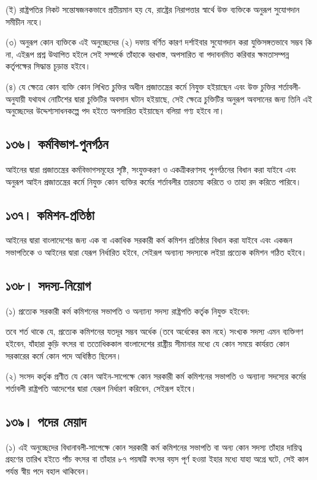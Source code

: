 \documentclass[11pt]{article}
\begin{document}
(ই) রাষ্ট্রপতির নিকট সন্তোষজনকভাবে প্রতীয়মান হয় যে, রাষ্ট্রের নিরাপত্তার
    স্বার্থে উক্ত ব্যক্তিকে অনুরূপ সুযোগদান সমীচীন নহে।

(৩) অনুরূপ কোন ব্যক্তিকে এই অনুচ্ছেদের (২) দফায় বর্ণিত কারণ দর্শাইবার সুযোগদান
    করা যুক্তিসঙ্গতভাবে সম্ভব কি না, এইরূপ প্রশ্ন উত্থাপিত হইলে সেই সম্পর্কে তাঁহাকে
    বরখাস্ত, অপসারিত বা পদাবনমিত করিবার ক্ষমতাসম্পন্ন কর্তৃপক্ষের সিদ্ধান্ত চূড়ান্ত
    হইবে।

(৪) যে ক্ষেত্রে কোন ব্যক্তি কোন লিখিত চুক্তির অধীন প্রজাতন্ত্রের কর্মে নিযুক্ত
    হইয়াছেন এবং উক্ত চুক্তির শর্তাবলী-অনুযায়ী যথাযথ নোটিশের দ্বারা চুক্তিটির অবসান
    ঘটান হইয়াছে, সেই ক্ষেত্রে চুক্তিটির অনুরূপ অবসানের জন্য তিনি এই অনুচ্ছেদের
    উদ্দেশ্যসাধনকল্পে পদ হইতে অপসারিত হইয়াছেন বলিয়া গণ্য হইবে না।

\subsection{১৩৬। কর্মবিভাগ-পুনর্গঠন}
\label{sec:org8ce6071}
আইনের দ্বারা প্রজাতন্ত্রের কর্মবিভাগসমূহের সৃষ্টি, সংযুক্তকরণ ও একত্রীকরণসহ
পুনর্গঠনের বিধান করা যাইবে এবং অনুরূপ আইন প্রজাতন্ত্রের কর্মে নিযুক্ত কোন ব্যক্তির
কর্মের শর্তাবলীর তারতম্য করিতে ও তাহা রদ করিতে পারিবে।

\subsection{১৩৭। কমিশন-প্রতিষ্ঠা}
\label{sec:org63d3256}
আইনের দ্বারা বাংলাদেশের জন্য এক বা একাধিক সরকারী কর্ম কমিশন প্রতিষ্ঠার
বিধান করা যাইবে এবং একজন সভাপতিকে ও আইনের দ্বারা যেরূপ নির্ধারিত হইবে,
সেইরূপ অন্যান্য সদস্যকে লইয়া প্রত্যেক কমিশন গঠিত হইবে।

\subsection{১৩৮। সদস্য-নিয়োগ}
\label{sec:org170a6c6}
(১) প্রত্যেক সরকারী কর্ম কমিশনের সভাপতি ও অন্যান্য সদস্য রাষ্ট্রপতি কর্তৃক নিযুক্ত
    হইবেন:

তবে শর্ত থাকে যে, প্রত্যেক কমিশনের যতদূর সম্ভব অর্ধেক (তবে অর্ধেকের কম নহে)
সংখ্যক সদস্য এমন ব্যক্তিগণ হইবেন, যাঁহারা কুড়ি বৎসর বা ততোধিককাল বাংলাদেশের
রাষ্ট্রীয় সীমানার মধ্যে যে কোন সময়ে কার্যরত কোন সরকারের কর্মে কোন পদে
অধিষ্ঠিত ছিলেন।

(২) সংসদ কর্তৃক প্রণীত যে কোন আইন-সাপেক্ষে কোন সরকারী কর্ম কমিশনের সভাপতি ও
    অন্যান্য সদস্যের কর্মের শর্তাবলী রাষ্ট্রপতি আদেশের দ্বারা যেরূপ নির্ধারণ করিবেন,
    সেইরূপ হইবে।

\subsection{১৩৯। পদের মেয়াদ}
\label{sec:orgbd8a719}
(১) এই অনুচ্ছেদের বিধানাবলী-সাপেক্ষে কোন সরকারী কর্ম কমিশনের সভাপতি বা অন্য
    কোন সদস্য তাঁহার দায়িত্ব গ্রহণের তারিখ হইতে পাঁচ বৎসর বা তাঁহার ৮৭ পয়ষট্টি
    বৎসর বয়স পূর্ণ হওয়া ইহার মধ্যে যাহা অগ্রে ঘটে, সেই কাল পর্যন্ত স্বীয় পদে বহাল
    থাকিবেন।
\end{document}

